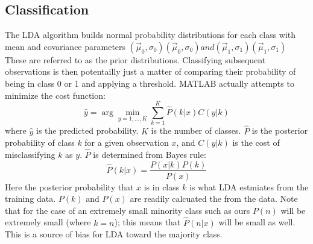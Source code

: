 \documentclass{article}
\begin{document}
\subsection{Classification}


The LDA algorithm builds normal probability distributions for each class with mean and covariance parameters $\left({\vec {\mu }}_{0}, \sigma_{0} \right) \left({\vec {\mu }}_{0}, \sigma_{0}\right) and \left({\vec {\mu }}_{1},\sigma_{1}\right) \left({\vec {\mu }}_{1}, \sigma_{1}\right)$
These are referred to as the prior distributions. Classifying subsequent observations is then potentailly just a matter of comparing their probability of being in class 0 or 1 and applying a threshold.
MATLAB actually attempts to minimize the cost function:
\begin{equation}
\hat{y}=\arg\min_{y=1,...,K}\sum_{k=1}^{K}\hat{P}(k|x)C(y|k)
\end{equation}
where $\hat{y}$ is the predicted probability. $K$ is the number of classes. $\hat{P}$ is the posterior probability of class $k$ for a given observation $x$, and $C(y|k)$ is the cost of misclassifying $k$ as $y$.
$\hat{P}$ is determined from Bayes rule:
\begin{equation}
\hat{P}(k|x)=\frac{P(x|k)P(k)}{P(x)}
\end{equation}
Here the posterior probability that $x$ is in class $k$ is what LDA estmiates from the training data.
$P(k)$ and $P(x)$ are readily calcuated the from the data.
Note that for the case of an extremely small minority class such as ours $P(n)$ will be extremely small (where $k=n$); this means that $\hat{P}(n|x)$ will be small as well.
This is a source of bias for LDA toward the majority class.
\end{document}
